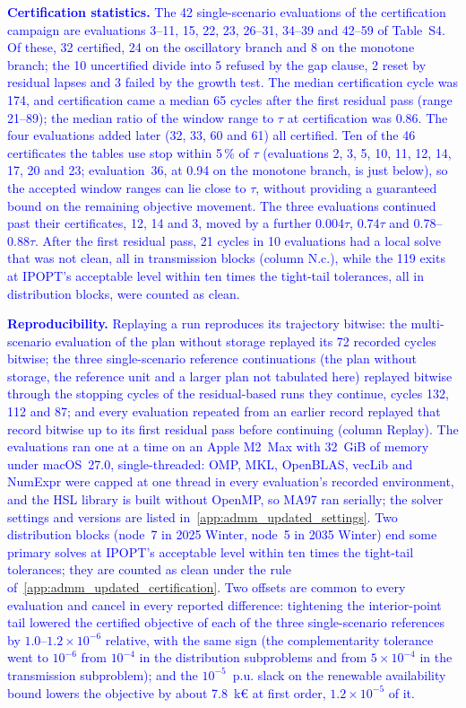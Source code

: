 \documentclass[preprint,12pt]{elsarticle}
\begin{document}
\textcolor{blue}{
    \textbf{Certification statistics.} The 42 single-scenario evaluations of the certification campaign are evaluations 3--11, 15, 22, 23, 26--31, 34--39 and 42--59 of Table~S4. Of these, 32 certified, 24 on the oscillatory branch and 8 on the monotone branch; the 10 uncertified divide into 5 refused by the gap clause, 2 reset by residual lapses and 3 failed by the growth test. The median certification cycle was 174, and certification came a median 65 cycles after the first residual pass (range 21--89); the median ratio of the window range to $\tau$ at certification was 0.86. The four evaluations added later (32, 33, 60 and 61) all certified. Ten of the 46 certificates the tables use stop within 5\,\% of $\tau$ (evaluations 2, 3, 5, 10, 11, 12, 14, 17, 20 and 23; evaluation~36, at 0.94 on the monotone branch, is just below), so the accepted window ranges can lie close to $\tau$, without providing a guaranteed bound on the remaining objective movement. The three evaluations continued past their certificates, 12, 14 and 3, moved by a further 0.004$\tau$, 0.74$\tau$ and 0.78--0.88$\tau$. After the first residual pass, 21 cycles in 10 evaluations had a local solve that was not clean, all in transmission blocks (column N.c.), while the 119 exits at IPOPT's acceptable level within ten times the tight-tail tolerances, all in distribution blocks, were counted as clean.
}

\textcolor{blue}{
    \textbf{Reproducibility.} Replaying a run reproduces its trajectory bitwise: the multi-scenario evaluation of the plan without storage replayed its 72 recorded cycles bitwise; the three single-scenario reference continuations (the plan without storage, the reference unit and a larger plan not tabulated here) replayed bitwise through the stopping cycles of the residual-based runs they continue, cycles 132, 112 and 87; and every evaluation repeated from an earlier record replayed that record bitwise up to its first residual pass before continuing (column Replay). The evaluations ran one at a time on an Apple M2~Max with 32~GiB of memory under macOS~27.0, single-threaded: OMP, MKL, OpenBLAS, vecLib and NumExpr were capped at one thread in every evaluation's recorded environment, and the HSL library is built without OpenMP, so MA97 ran serially; the solver settings and versions are listed in~\ref{app:admm_updated_settings}. Two distribution blocks (node~7 in 2025 Winter, node~5 in 2035 Winter) end some primary solves at IPOPT's acceptable level within ten times the tight-tail tolerances; they are counted as clean under the rule of~\ref{app:admm_updated_certification}. Two offsets are common to every evaluation and cancel in every reported difference: tightening the interior-point tail lowered the certified objective of each of the three single-scenario references by $1.0$--$1.2 \times 10^{-6}$ relative, with the same sign (the complementarity tolerance went to $10^{-6}$ from $10^{-4}$ in the distribution subproblems and from $5 \times 10^{-4}$ in the transmission subproblem); and the $10^{-5}$~p.u. slack on the renewable availability bound lowers the objective by about 7.8~k\euro{} at first order, $1.2 \times 10^{-5}$ of it.
}
\end{document}
